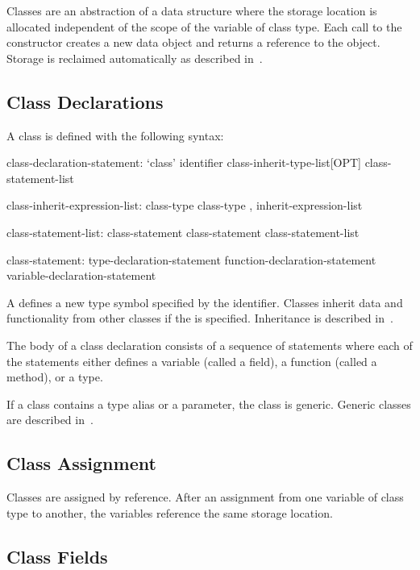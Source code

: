 \label{Classes}

Classes are an abstraction of a data structure where the storage
location is allocated independent of the scope of the variable of
class type.  Each call to the constructor creates a new data object
and returns a reference to the object.  Storage is reclaimed
automatically as described in~.

\subsection{Class Declarations}
\label{Class_Declarations}

A class is defined with the following syntax:
\begin{syntax}
class-declaration-statement:
  `class' identifier class-inherit-type-list[OPT] {
    class-statement-list }

class-inherit-expression-list:
  class-type
  class-type , inherit-expression-list

class-statement-list:
  class-statement
  class-statement class-statement-list

class-statement:
  type-declaration-statement
  function-declaration-statement
  variable-declaration-statement
\end{syntax}
A  defines a new type symbol
specified by the identifier.  Classes inherit data and functionality
from other classes if the  is specified.
Inheritance is described in~.

The body of a class declaration consists of a sequence of statements
where each of the statements either defines a variable (called a
field), a function (called a method), or a type.

If a class contains a type alias or a parameter, the class is generic.
Generic classes are described in~.

\subsection{Class Assignment}
\label{Class_Assignment}

Classes are assigned by reference.  After an assignment from one
variable of class type to another, the variables reference the same
storage location.

\subsection{Class Fields}
\label{Class_Fields}

